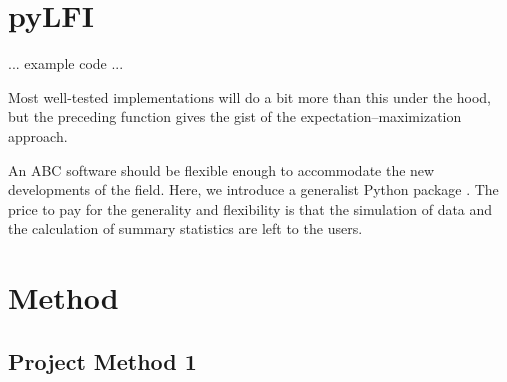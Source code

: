 \section{pyLFI}\label{sec:pylfi}




... example code ...

Most well-tested implementations will do a bit more than this under the hood, but the preceding function gives the gist of the expectation–maximization approach.

An ABC software should be flexible enough to accommodate the new developments of the field. Here, we introduce a generalist Python package . The price to pay for the generality and flexibility is that the simulation of data and the calculation of summary statistics are left to the users. 

\section{Method}\label{sec:Method}

\subsection{Project Method 1}\label{sec:project method}

